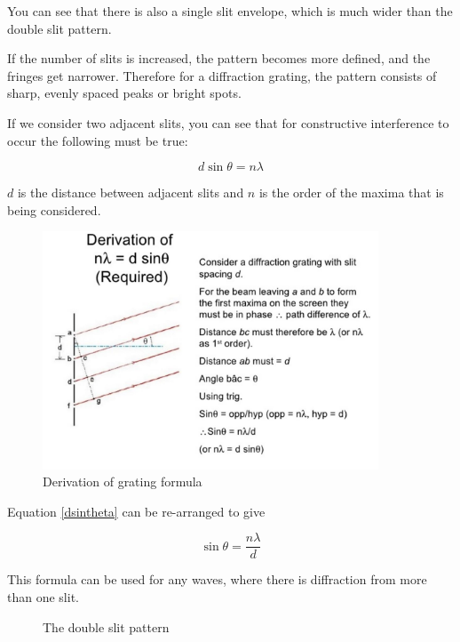 \documentclass[revision-guide.tex]{subfiles}
\begin{document}
You can see that there is also a single slit envelope, which is much wider than the double slit pattern.

If the number of slits is increased, the pattern becomes more defined, and the fringes get narrower. Therefore for a diffraction grating, the pattern consists of sharp, evenly spaced peaks or bright spots.

If we consider two adjacent slits, you can see that for constructive interference to occur the following must be true:

\begin{equation}\label{dsintheta}
d \sin\theta = n\lambda
\end{equation}

$d$ is the distance between adjacent slits and $n$ is the order of the maxima that is being considered.

\begin{figure}[h!]
\centering
\includegraphics[width=10cm]{figs/chapt-7/diffractioneq.JPG}
\caption{Derivation of grating formula}
\end{figure}

Equation \ref{dsintheta} can be re-arranged to give

\begin{equation}
\sin\theta = \frac{n\lambda}{d}
\end{equation}

This formula can be used for any waves, where there is diffraction from more than one slit.

\newpage

\begin{figure}[h]
    \centering
    \caption{The double slit pattern}
    \label{doubleslitscreen}
\end{figure}
\end{document}
